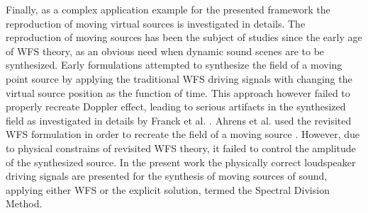 Finally, as a complex application example for the presented framework the reproduction of moving virtual sources is investigated in details.
The reproduction of moving sources has been the subject of studies since the early age of WFS theory, as an obvious need when dynamic sound scenes are to be synthesized.
Early formulations attempted to synthesize the field of a moving point source by applying the traditional WFS driving signals with changing the virtual source position as the function of time.
This approach however failed to properly recreate Doppler effect, leading to serious artifacts in the synthesized field as investigated in details by Franck et al. \cite{Franck2007}.
Ahrens et al. used the revisited WFS formulation in order to recreate the field of a moving source \cite{Ahrens2008moving, Ahrens2008moving_b, Ahrens2012}.
However, due to physical constrains of revisited WFS theory, it failed to control the amplitude of the synthesized source.
In the present work the physically correct loudspeaker driving signals are presented for the synthesis of moving sources of sound, applying either WFS or  the explicit solution, termed the Spectral Division Method.

